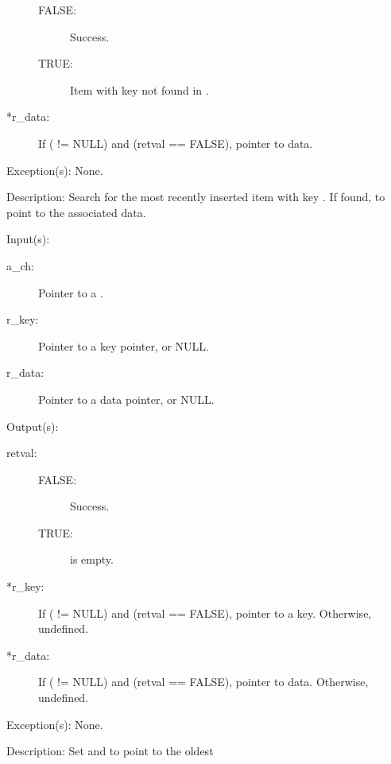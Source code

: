 \begin{capi}
\begin{capilist}
\begin{description}
\begin{description}
			\item[FALSE: ]
				Success.
			\item[TRUE: ]
				Item with key  not found in
				.
			\end{description}
		\item[*r\_data: ]
			If ( != NULL) and (retval == FALSE),
			pointer to data.
		\end{description}
	\item[Exception(s): ] None.
	\item[Description: ]
		Search for the most recently inserted item with key
		.  If found,  to point to the
		associated data.
	\end{capilist}
\label{ch_get_iterate}
	\begin{capilist}
	\item[Input(s): ]
		\begin{description}\item[]
		\item[a\_ch: ]
			Pointer to a .
		\item[r\_key: ]
			Pointer to a key pointer, or NULL.
		\item[r\_data: ]
			Pointer to a data pointer, or NULL.
		\end{description}
	\item[Output(s): ]
		\begin{description}\item[]
		\item[retval: ]
			\begin{description}\item[]
			\item[FALSE: ]
				Success.
			\item[TRUE: ]
				 is empty.
			\end{description}
		\item[*r\_key: ]
			If ( != NULL) and (retval == FALSE),
			pointer to a key.  Otherwise, undefined.
		\item[*r\_data: ]
			If ( != NULL) and (retval == FALSE),
			pointer to data.  Otherwise, undefined.
		\end{description}
	\item[Exception(s): ] None.
	\item[Description: ]
		Set  and  to point to the oldest

\end{capilist}
\end{capi}
